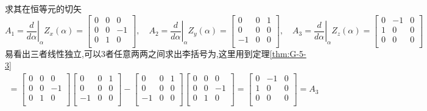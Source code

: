 \documentclass[../main.tex]{subfiles}
\begin{document}
求其在恒等元的切矢$$
A_1 = \left.\frac{d}{d\alpha}\right|_\alpha Z_x(\alpha)= \begin{bmatrix}
    0&0&0\\    
    0&0&-1\\
    0&1&0\\    
\end{bmatrix},\quad
A_2 = \left.\frac{d}{d\alpha}\right|_\alpha Z_y(\alpha)=  \begin{bmatrix}
    0&0&1\\    
    0&0&0\\
    -1&0&0\\    
\end{bmatrix},\quad
A_3 = \left.\frac{d}{d\alpha}\right|_\alpha Z_z(\alpha)=  \begin{bmatrix}
    0&-1&0\\    
    1&0&0\\
    0&0&0\\    
\end{bmatrix}$$
易看出三者线性独立,可以3者任意两两之间求出李括号为,这里用到定理\ref{thm:G-5-3}
\begin{align*}
    [A_1,A_2] = \begin{bmatrix}
    0&0&0\\    
    0&0&-1\\
    0&1&0\\    
\end{bmatrix} \begin{bmatrix}
    0&0&1\\    
    0&0&0\\
    -1&0&0\\    
\end{bmatrix}-
\begin{bmatrix}
    0&0&1\\    
    0&0&0\\
   -1&0&0\\    
\end{bmatrix} \begin{bmatrix}
    0&0&0\\    
    0&0&-1\\
    0&1&0\\    
\end{bmatrix}= \begin{bmatrix}
    0&-1&0\\    
    1&0&0\\
    0&0&0\\    
\end{bmatrix}
=A_3
\end{align*}
\end{document}
